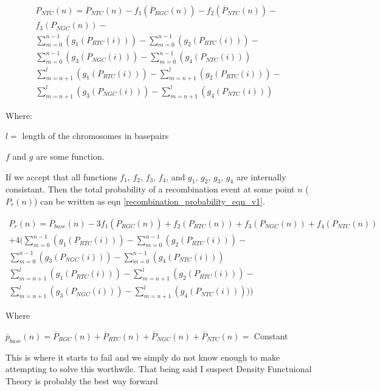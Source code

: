 \documentclass{article}
\begin{document}
        \begin{multline}\label{complex_probabilities_4}
            {P}_{NTC}(n) = \overline{P}_{NTC}(n) - f_1(\overline{P}_{RGC}(n)) - f_2(\overline{P}_{NTC}(n)) - \\ f_3(P_{NGC}(n)) - \\ \sum_{m = 0}^{n-1}(g_1(P_{RTC}(i))) - \sum_{m = 0}^{n-1}(g_2(P_{RTC}(i))) - \\ \sum_{m = 0}^{n-1}(g_3(P_{NGC}(i))) - \sum_{m = 0}^{n-1}(g_4(P_{NTC}(i))) \\ \sum_{m = n+1}^{l}(g_1(P_{RTC}(i))) - \sum_{m = n+1}^{l}(g_2(P_{RTC}(i))) - \\ \sum_{m = n+1}^{l}(g_3(P_{NGC}(i))) - \sum_{m = n+1}^{l}(g_4(P_{NTC}(i))) 
        \end{multline}

        Where: 

        \(l =\) length of the chromosomes in basepairs

        \(f\) and \(g\) are some function. \bigbreak


        If we accept that all functions \(f_1\), \(f_2\), \(f_3\), \(f_4\), and \(g_1\), \(g_2\), \(g_3\), \(g_4\) are internally consistant.  Then the total probability of a recombination event at some point \(n\) (\(P_r(n)\)) can be written as eqn \ref{recombination_probability_eqn_v1}.

        \begin{multline}\label{recombination_probability_eqn_v1}
            P_r(n) = \overline{P}_{base}(n) - 3{f_1(\overline{P}_{RGC}(n)) + f_2(P_{RTC}(n)) + f_3(P_{NGC}(n)) + f_4(P_{NTC}(n))}\\
                + 4(\sum_{m = 0}^{n-1}(g_1(P_{RTC}(i))) - \sum_{m = 0}^{n-1}(g_2(P_{RTC}(i))) - \\ \sum_{m = 0}^{n-1}(g_3(P_{NGC}(i))) - \sum_{m = 0}^{n-1}(g_4(P_{NTC}(i))) \\ \sum_{m = n+1}^{l}(g_1(P_{RTC}(i))) - \sum_{m = n+1}^{l}(g_2(P_{RTC}(i))) - \\ \sum_{m = n+1}^{l}(g_3(P_{NGC}(i))) - \sum_{m = n+1}^{l}(g_4(P_{NTC}(i)))))
        \end{multline}
        
        Where

        \(\overline{p}_{base}(n) =  \overline{P}_{RGC}(n) + \overline{P}_{RTC}(n) + \overline{P}_{NGC}(n) + \overline{P}_{NTC}(n) =\) Constant

        This is where it starts to fail and we simply do not know enough to make attempting to solve this worthwile.  That being said I suspect Density Functuional Theory is probably the best way forward
\end{document}

